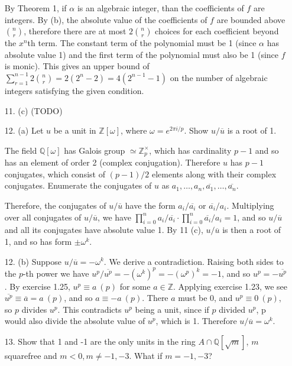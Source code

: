 \documentclass{article}
\newcommand{\w}[0]{\omega}
\newcommand{\Q}[0]{\mathbb{Q}}
\newcommand{\Z}[0]{\mathbb{Z}}
\begin{document}
\begin{enumerate}
By Theorem 1, if $\alpha$ is an algebraic integer, than the coefficients of $f$ are integers.  By (b), the absolute value of the coefficients of $f$ are bounded above $\binom{n}{r}$, therefore there are at most $2\binom{n}{r}$ choices for each coefficient beyond the $x^n$th term.  The constant term of the polynomial must be 1 (since $\alpha$ has absolute value 1) and the first term of the polynomial must also be 1 (since $f$ is monic). This gives an upper bound of $\sum_{r=1}^{n - 1} 2\binom{n}{r} = 2(2^n - 2) = 4(2^{n-1} - 1)$ on the number of algebraic integers satisfying the given condition.

\item[11. (c)]{(TODO)}

\item[12. (a)] Let $u$ be a unit in $\Z[\w]$, where $\w = e^{2\pi i / p}$.  Show $u / \overline{u}$ is a root of 1.

The field $\Q[\w]$ has Galois group $\simeq \Z_p^{\times}$, which has cardinality $p - 1$ and so has an element of order 2 (complex conjugation).  Therefore $u$ has $p - 1$ conjugates, which consist of $(p - 1) / 2$ elements along with their complex conjugates.  Enumerate the conjugates of $u$ as $a_1, \ldots, a_n, \overline{a_1}, \ldots, \overline{a_n}$.

Therefore, the conjugates of $u / \overline{u}$ have the form $a_i / \overline{a_i}$ or $\overline{a_i} / a_i$.  Multiplying over all conjugates of $u / \overline{u}$, we have $\prod_{i = 0}^{n} a_i / \overline{a_i} \cdot \prod_{i = 0}^{n} \overline{a_i} / a_i = 1$, and so $u / \overline{u}$ and all its conjugates have absolute value 1.  By 11 (c), $u / \overline{u}$ is then a root of 1, and so has form $\pm \omega^{k}$.

\item[12. (b)] Suppose $u / \overline{u} = -\omega^{k}$.  We derive a contradiction.  Raising both sides to the $p$-th power we have $u^p / \overline{u^p} = -(\omega^{k})^p = -(\omega^{p})^k = -1$, and so $u^p = -\overline{u^p}$.  By exercise 1.25, $u^p \equiv a\ (p)$ for some $a \in \Z$.  Applying exercise 1.23, we see $\overline{u^p} \equiv \overline{a} = a\ (p)$, and so $a \equiv -a\ (p)$.  There $a$ must be 0, and $u^p \equiv 0\ (p)$, so $p$ divides $u^p$.  This contradicts $u^p$ being a unit, since if $p$ divided $u^p$, p would also divide the absolute value of $u^p$, which is 1.  Therefore $u / \overline{u} = \omega^{k}$.

\item[13.] Show that 1 and -1 are the only units in the ring $A \cap \Q[\sqrt{m}]$, $m$ squarefree and $m < 0, m \neq -1, -3$.  What if $m = -1, -3$?


\end{enumerate}
\end{document}
